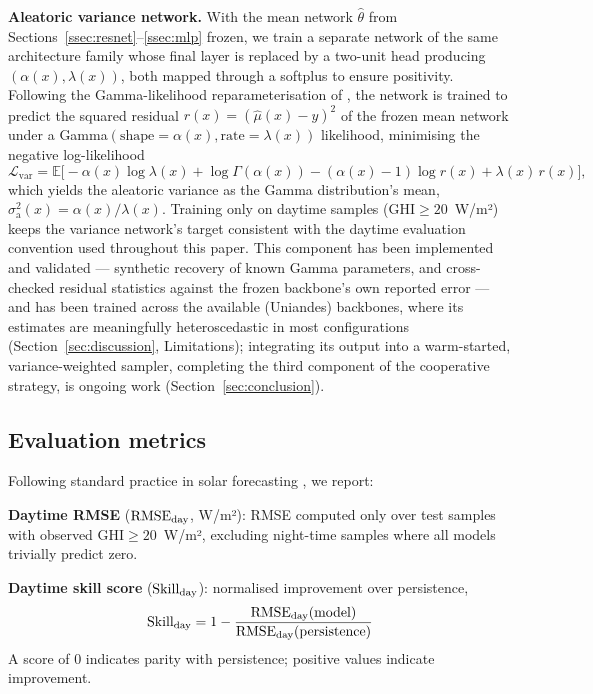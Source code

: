 \textbf{Aleatoric variance network.} With the mean network $\hat\theta$
from Sections~\ref{ssec:resnet}--\ref{ssec:mlp} frozen, we train a separate
network of the same architecture family whose final layer is replaced by a
two-unit head producing $(\alpha(x), \lambda(x))$, both mapped through a
softplus to ensure positivity. Following the Gamma-likelihood
reparameterisation of \citet{yi2025cooperative}, the network is trained to
predict the squared residual $r(x) = (\hat\mu(x) - y)^2$ of the frozen mean
network under a Gamma$(\text{shape}=\alpha(x), \text{rate}=\lambda(x))$
likelihood, minimising the negative log-likelihood
\begin{equation}
  \mathcal{L}_\text{var} = \mathbb{E}\bigl[-\alpha(x)\log\lambda(x)
  + \log\Gamma(\alpha(x)) - (\alpha(x)-1)\log r(x) + \lambda(x)\,r(x)\bigr],
  \label{eq:gamma_nll}
\end{equation}
which yields the aleatoric variance as the Gamma distribution's mean,
$\sigma^2_\text{a}(x) = \alpha(x)/\lambda(x)$. Training only on daytime
samples ($\text{GHI} \geq 20$~W/m²) keeps the variance network's target
consistent with the daytime evaluation convention used throughout this
paper. This component has been implemented and validated --- synthetic
recovery of known Gamma parameters, and cross-checked residual statistics
against the frozen backbone's own reported error --- and has been trained
across the available (Uniandes) backbones, where its estimates are
meaningfully heteroscedastic in most configurations
(Section~\ref{sec:discussion}, Limitations); integrating its output into a
warm-started, variance-weighted sampler, completing the third component of
the cooperative strategy, is ongoing work (Section~\ref{sec:conclusion}).

\subsection{Evaluation metrics}

Following standard practice in solar forecasting \cite{coimbra2013,zhang2015}, we report:

\textbf{Daytime RMSE} ($\text{RMSE}_\text{day}$, W/m²): RMSE computed only over test samples
with observed $\text{GHI} \geq 20$~W/m², excluding night-time samples where all
models trivially predict zero.

\textbf{Daytime skill score} ($\text{Skill}_\text{day}$): normalised improvement over persistence,
\begin{equation}
  \text{Skill}_\text{day} = 1 - \frac{\text{RMSE}_\text{day}(\text{model})}{\text{RMSE}_\text{day}(\text{persistence})}
  \label{eq:skill}
\end{equation}
A score of 0 indicates parity with persistence; positive values indicate improvement.